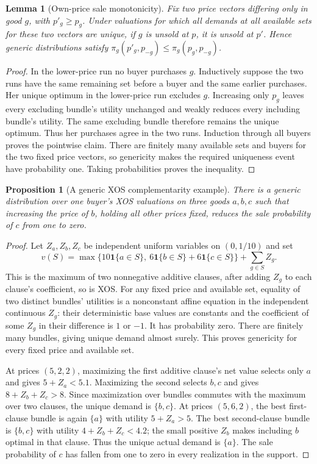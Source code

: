 \documentclass[11pt]{article}
\newtheorem{proposition}[theorem]{Proposition}
\newtheorem{lemma}[theorem]{Lemma}
\theoremstyle{remark}
\newcommand{\Ind}{\mathbf 1}
\begin{document}
\begin{lemma}[Own-price sale monotonicity]\label{own}
Fix two price vectors differing only in good $g$, with
$p'_g\geq p_g$. Under valuations for which all demands at all available
sets for these two vectors are unique, if $g$ is unsold at $p$, it is
unsold at $p'$. Hence generic distributions satisfy
$\pi_g(p'_g,p_{-g})\leq\pi_g(p_g,p_{-g})$.
\end{lemma}
\begin{proof}
In the lower-price run no buyer purchases $g$. Inductively suppose the
two runs have the same remaining set before a buyer and the same earlier
purchases. Her unique optimum in the lower-price run excludes $g$.
Increasing only $p_g$ leaves every excluding bundle's utility unchanged
and weakly reduces every including bundle's utility. The same excluding
bundle therefore remains the unique optimum. Thus her purchases agree
in the two runs. Induction through all buyers proves the pointwise
claim. There are finitely many available sets and buyers for the two
fixed price vectors, so genericity makes the required uniqueness event
have probability one. Taking probabilities proves the inequality.
\end{proof}

\begin{proposition}[A generic XOS complementarity example]\label{counter}
There is a generic distribution over one buyer's XOS valuations on
three goods $a,b,c$ such that increasing the price of $b$, holding all
other prices fixed, reduces the sale probability of $c$ from one to
zero.
\end{proposition}
\begin{proof}
Let $Z_a,Z_b,Z_c$ be independent uniform variables on $(0,1/10)$ and set
\[
 v(S)=\max\{10\Ind\{a\in S\},\
                 6\Ind\{b\in S\}+6\Ind\{c\in S\}\}
       +\sum_{g\in S}Z_g.
\]
This is the maximum of two nonnegative additive clauses, after adding
$Z_g$ to each clause's coefficient, so is XOS.
For any fixed price and available set, equality of two distinct
bundles' utilities is a nonconstant affine equation in the independent
continuous $Z_g$: their deterministic base values are constants and
the coefficient of some $Z_g$ in their difference is $1$ or $-1$.
It has probability zero. There are finitely many bundles, giving
unique demand almost surely. This proves genericity for every fixed
price and available set.

At prices $(5,2,2)$, maximizing the first additive clause's net value
selects only $a$ and gives $5+Z_a<5.1$. Maximizing the second selects
$b,c$ and gives $8+Z_b+Z_c>8$. Since maximization over bundles commutes
with the maximum over two clauses, the unique demand is $\{b,c\}$.
At prices $(5,6,2)$, the best first-clause bundle is again $\{a\}$
with utility $5+Z_a>5$. The best second-clause bundle is $\{b,c\}$
with utility $4+Z_b+Z_c<4.2$; the small positive $Z_b$ makes including
$b$ optimal in that clause. Thus the unique actual demand is $\{a\}$.
The sale probability of $c$ has fallen from one to zero in every
realization in the support.
\end{proof}
\end{document}
